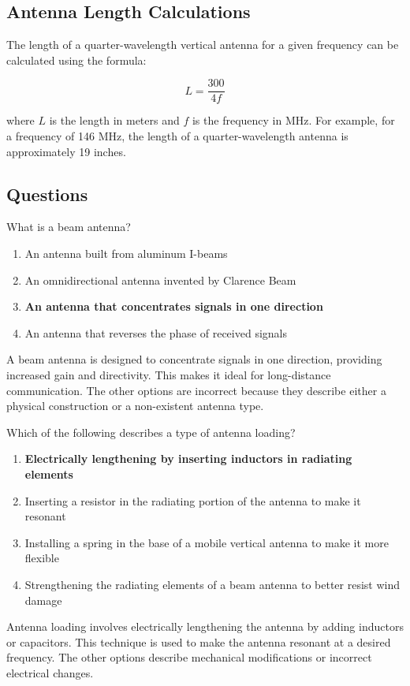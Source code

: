 \subsection*{Antenna Length Calculations}
The length of a quarter-wavelength vertical antenna for a given frequency can be calculated using the formula:

\begin{equation}
    L = \frac{300}{4f}
    \label{eq:antenna_length}
\end{equation}

where \( L \) is the length in meters and \( f \) is the frequency in MHz. For example, for a frequency of 146 MHz, the length of a quarter-wavelength antenna is approximately 19 inches.

\subsection*{Questions}

\begin{tcolorbox}[colback=gray!10!white,colframe=black!75!black,title={T9A01}]
    What is a beam antenna?
    \begin{enumerate}[label=\Alph*,noitemsep]
        \item An antenna built from aluminum I-beams
        \item An omnidirectional antenna invented by Clarence Beam
        \item \textbf{An antenna that concentrates signals in one direction}
        \item An antenna that reverses the phase of received signals
    \end{enumerate}
\end{tcolorbox}
A beam antenna is designed to concentrate signals in one direction, providing increased gain and directivity. This makes it ideal for long-distance communication. The other options are incorrect because they describe either a physical construction or a non-existent antenna type.


\begin{tcolorbox}[colback=gray!10!white,colframe=black!75!black,title={T9A02}]
    Which of the following describes a type of antenna loading?
    \begin{enumerate}[label=\Alph*,noitemsep]
        \item \textbf{Electrically lengthening by inserting inductors in radiating elements}
        \item Inserting a resistor in the radiating portion of the antenna to make it resonant
        \item Installing a spring in the base of a mobile vertical antenna to make it more flexible
        \item Strengthening the radiating elements of a beam antenna to better resist wind damage
    \end{enumerate}
\end{tcolorbox}
Antenna loading involves electrically lengthening the antenna by adding inductors or capacitors. This technique is used to make the antenna resonant at a desired frequency. The other options describe mechanical modifications or incorrect electrical changes.

